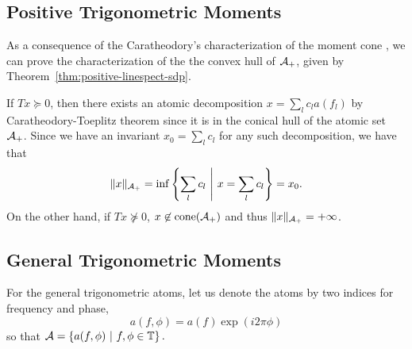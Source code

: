\subsection{Positive Trigonometric Moments} %
\label{sub:positive_trigonometric_moments}

As a consequence of the Caratheodory's characterization of the moment cone , we can  prove the  characterization of the the convex hull of $\mathcal{A}_+$, given by Theorem~\ref{thm:positive-linespect-sdp}.

If $T x \succeq 0$, then there exists an atomic decomposition $x = \sum_l c_l a(f_l)$ by Caratheodory-Toeplitz theorem since it is in the conical hull of the atomic set $\mathcal{A}_+$. Since we have an invariant $x_0 = \sum_l c_l$ for any such decomposition, we have that
\[
\lVert x\rVert_{\mathcal{A}_{+}}  = \inf\left\{ \sum_l{c_l} ~\middle|~ x = \sum_l c_l \right\} = x_0.
\]
On the other hand, if $Tx \not\succeq 0$, $x \not\in \operatorname{cone}(\mathcal{A}_+)$ and thus $\lVert x\rVert_{\mathcal{A}_{+}} = +\infty$.



\subsection{General Trigonometric Moments} %
\label{sub:general_trigonometric_moments}

For the general trigonometric atoms, let us denote the atoms by two indices for  frequency and phase,
\[
	a(f,\phi) = a(f) \exp(i 2\pi \phi)
\]
so that $\mathcal{A} = \left\{ a(f,\phi) ~\middle|~ f, \phi \in \mathbb{T} \right\}.$

